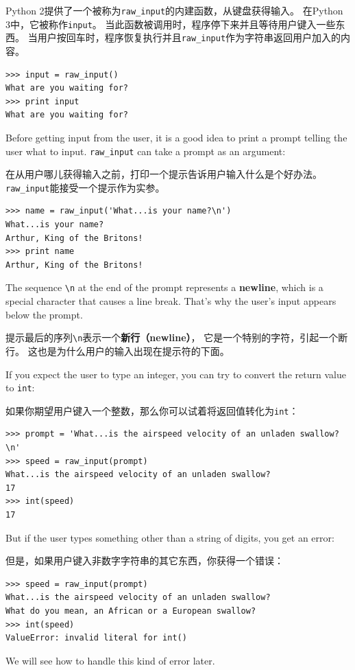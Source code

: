 \documentclass[10pt]{book}
\begin{document}
\begin{CJK}{UTF8}{gbsn}
Python 2提供了一个被称为\verb"raw_input"的内建函数，从键盘获得输入。
在Python 3中，它被称作{\tt input}。
当此函数被调用时，程序停下来并且等待用户键入一些东西。
当用户按回车时，程序恢复执行并且\verb"raw_input"作为字符串返回用户加入的内容。

\begin{verbatim}
>>> input = raw_input()
What are you waiting for?
>>> print input
What are you waiting for?
\end{verbatim}
%
Before getting input from the user, it is a good idea to print a
prompt telling the user what to input.  \verb"raw_input" can take a
prompt as an argument:

在从用户哪儿获得输入之前，打印一个提示告诉用户输入什么是个好办法。
\verb"raw_input"能接受一个提示作为实参。

\begin{verbatim}
>>> name = raw_input('What...is your name?\n')
What...is your name?
Arthur, King of the Britons!
>>> print name
Arthur, King of the Britons!
\end{verbatim}
%
The sequence \verb"\n" at the end of the prompt represents a {\bf newline},
which is a special character that causes a line break.
That's why the user's input appears below the prompt.

提示最后的序列\verb"\n"表示一个{\bf 新行（newline）}，
它是一个特别的字符，引起一个断行。
这也是为什么用户的输入出现在提示符的下面。

If you expect the user to type an integer, you can try to convert
the return value to {\tt int}:

如果你期望用户键入一个整数，那么你可以试着将返回值转化为{\tt int}：

\begin{verbatim}
>>> prompt = 'What...is the airspeed velocity of an unladen swallow?\n'
>>> speed = raw_input(prompt)
What...is the airspeed velocity of an unladen swallow?
17
>>> int(speed)
17
\end{verbatim}
%
But if the user types something other than a string of digits,
you get an error:

但是，如果用户键入非数字字符串的其它东西，你获得一个错误：

\begin{verbatim}
>>> speed = raw_input(prompt)
What...is the airspeed velocity of an unladen swallow?
What do you mean, an African or a European swallow?
>>> int(speed)
ValueError: invalid literal for int()
\end{verbatim}
%
We will see how to handle this kind of error later.


\end{CJK}
\end{document}
